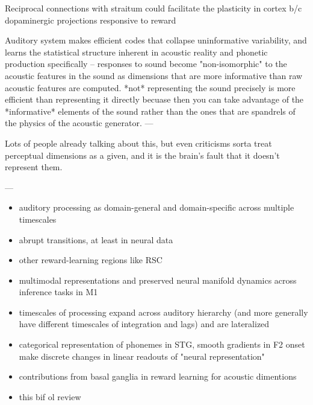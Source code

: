 

Reciprocal connections with straitum could facilitate the plasticity in cortex b/c dopaminergic projections responsive to reward \cite{fengRoleHumanAuditory2018}

Auditory system makes efficient codes that collapse uninformative variability, and learns the statistical structure inherent in acoustic reality \cite{schiavoCapacitiesNeuralMechanisms2019} and phonetic production specifically\cite{kuhlNewViewLanguage2000} -- responses to sound become "non-isomorphic" to the acoustic features in the sound \cite{stilpEfficientCodingStatistically2012,wangNeuralCodingStrategies2007} as dimensions that are more informative than raw acoustic features are computed. *not* representing the sound precisely is more efficient than representing it directly becuase then you can take advantage of the *informative* elements of the sound rather than the ones that are spandrels of the physics of the acoustic generator.
---


Lots of people already talking about this, but even criticisms sorta treat perceptual dimensions as a given, and it is the brain's fault that it doesn't represent them. \cite{goddardInterpretingDimensionsNeural2018a}

---


\begin{itemize}
\item auditory processing as domain-general and domain-specific across multiple timescales \cite{norman-haignereHierarchicalIntegrationMultiple2020}
\item abrupt transitions, at least in neural data \cite{durstewitzAbruptTransitionsPrefrontal2010}
\item other reward-learning regions like RSC \cite{millerRetrosplenialCorticalRepresentations2019}
\item multimodal representations and preserved neural manifold dynamics across inference tasks in M1 \cite{gallegoCorticalPopulationActivity2018}
\item timescales of processing expand across auditory hierarchy (and more generally have different timescales of integration and lags) \cite{norman-haignereHierarchicalIntegrationMultiple2020} and are lateralized \cite{levyCircuitAsymmetriesUnderlie2019a}
\item categorical representation of phonemes in STG, smooth gradients in F2 onset make discrete changes in linear readouts of "neural representation" \cite{changCategoricalSpeechRepresentation2010b}
\item contributions from basal ganglia in reward learning for acoustic dimentions \cite{limHowMayBasal2014}
\item this bif ol review \cite{rauscheckerMapsStreamsAuditory2009b}
\end{itemize}

